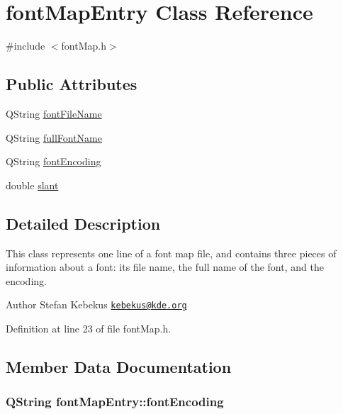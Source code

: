 \hypertarget{classfontMapEntry}{\section{font\+Map\+Entry Class Reference}
\label{classfontMapEntry}
}


{\ttfamily \#include $<$font\+Map.\+h$>$}

\subsection*{Public Attributes}
\begin{DoxyCompactItemize}
\item 
Q\+String \hyperlink{classfontMapEntry_af4c8fd84747774e601c2054c55b59612}{font\+File\+Name}
\item 
Q\+String \hyperlink{classfontMapEntry_ad9a5d53d1f22f9189481df1a649c2461}{full\+Font\+Name}
\item 
Q\+String \hyperlink{classfontMapEntry_af19fec792e25d78fed5dbe553dd710be}{font\+Encoding}
\item 
double \hyperlink{classfontMapEntry_a10335359f3ff636c6b38bd3426389d85}{slant}
\end{DoxyCompactItemize}


\subsection{Detailed Description}
This class represents one line of a font map file, and contains three pieces of information about a font\+: its file name, the full name of the font, and the encoding.

\begin{DoxyAuthor}{Author}
Stefan Kebekus \href{mailto:kebekus@kde.org}{\tt kebekus@kde.\+org} 
\end{DoxyAuthor}


Definition at line 23 of file font\+Map.\+h.



\subsection{Member Data Documentation}
\hypertarget{classfontMapEntry_af19fec792e25d78fed5dbe553dd710be}{
\subsubsection[{font\+Encoding}]{\setlength{\rightskip}{0pt plus 5cm}Q\+String font\+Map\+Entry\+::font\+Encoding}}\label{classfontMapEntry_af19fec792e25d78fed5dbe553dd710be}


